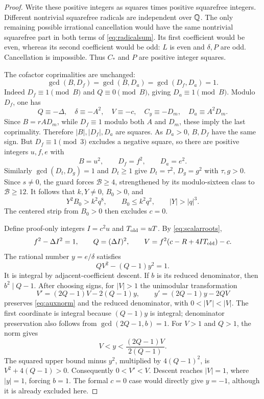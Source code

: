 \begin{proof}
Write these positive integers as squares times positive squarefree integers.
Different nontrivial squarefree radicals are independent over $\mathbb Q$.
The only remaining possible irrational cancellation would have the same
nontrivial squarefree part in both terms of \eqref{eq:radicalsum}.
Its first coefficient would be even, whereas its second coefficient would
be odd: $L$ is even and $\delta,P$ are odd. Cancellation is impossible.
Thus $C_*$ and $P$ are positive integer squares.

The cofactor coprimalities are unchanged:
\[
 \gcd(B,D_f)=\gcd(B,D_a)=\gcd(D_f,D_a)=1.
\]
Indeed $D_f\equiv1\pmod B$ and $Q\equiv0\pmod B$, giving
$D_a\equiv1\pmod B$. Modulo $D_f$, one has
\[
 Q\equiv-\Delta,\quad\delta\equiv-A^2,\quad
 V\equiv-c,\quad C_y\equiv-D_m,\quad
 D_a\equiv A^2D_m.
\]
Since $B=rAD_m$, while $D_f\equiv1$ modulo both $A$ and $D_m$,
these imply the last coprimality. Therefore $|B|,|D_f|,D_a$ are squares.
As $D_a>0$, $B,D_f$ have the same sign. But $D_f\equiv1\pmod3$
excludes a negative square, so there are positive integers $u,f,e$ with
\begin{equation}\label{eq:scalarroots}
 B=u^2,\qquad D_f=f^2,\qquad D_a=e^2.
\end{equation}
Similarly $\gcd(D_t,D_g)=1$ and $D_t\ge1$ give
$D_t=\tau^2$, $D_g=g^2$ with $\tau,g>0$.
Since $s\ne0$, the guard forces $\mathcal B\ge4$, strengthened by its
modulo-sixteen class to $\mathcal B\ge12$.
It follows that $k,Y\ne0$, $B_0>0$, and
\[
 Y^2B_0>k^2q^8,\qquad B_0\le k^2q^2,
 \qquad |Y|>|q|^3.
\]
The centered strip from $B_0>0$ then excludes $c=0$.

Define proof-only integers $I=c^2u$ and $T_{\rm old}=uT$.
By \eqref{eq:scalarroots},
\[
 f^2-\Delta I^2=1,\qquad Q=(\Delta I)^2,\qquad
 V=f^2(c-R+4IT_{\rm old})-c.
\]
The rational number $y=e/\delta$ satisfies
\begin{equation}\label{eq:auxnorm}
 QV^2-(Q-1)y^2=1.
\end{equation}
It is integral by adjacent-coefficient descent. If $b$ is its reduced
denominator, then $b^2\mid Q-1$. After choosing signs, for $|V|>1$ the
unimodular transformation
\[
 V'=(2Q-1)V-2(Q-1)y,\qquad
 y'=(2Q-1)y-2QV
\]
preserves \eqref{eq:auxnorm} and the reduced denominator, with
$0<|V'|<|V|$. The first coordinate is integral because $(Q-1)y$ is
integral; denominator preservation also follows from
$\gcd(2Q-1,b)=1$. For $V>1$ and $Q>1$, the norm gives
\[
 V<y<\frac{(2Q-1)V}{2(Q-1)}.
\]
The squared upper bound minus $y^2$, multiplied by $4(Q-1)^2$,
is $V^2+4(Q-1)>0$. Consequently $0<V'<V$.
Descent reaches $|V|=1$, where $|y|=1$, forcing $b=1$.
The formal $c=0$ case would directly give $y=-1$, although it is already
excluded here.


\end{proof}
